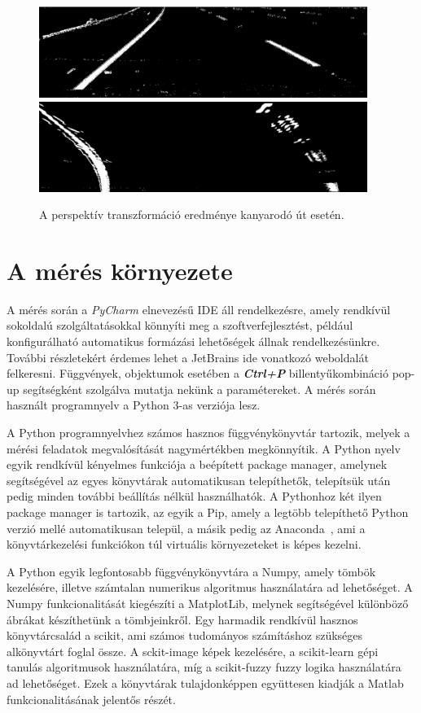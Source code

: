 \documentclass[12pt,a4paper,oneside]{report}             %
\begin{document}
\begin{figure}
	\centering
	\includegraphics[width=0.95\textwidth]{images/21.png}
	\includegraphics[width=0.95\textwidth]{images/22.png}
	\label{fig:2}
	\caption{A perspektív transzformáció eredménye kanyarodó út esetén.}
\end{figure}

\chapter{A mérés környezete}

A mérés során a \emph{PyCharm} elnevezésű IDE áll rendelkezésre, amely rendkívül sokoldalú szolgáltatásokkal könnyíti meg a szoftverfejlesztést, például konfigurálható automatikus formázási lehetőségek állnak rendelkezésünkre. További részletekért érdemes lehet a JetBrains ide vonatkozó weboldalát~\cite{pycharm} felkeresni. Függvények, objektumok esetében a \textbf{\textit{Ctrl+P}} billentyűkombináció pop-up segítségként szolgálva mutatja nekünk a paramétereket. A mérés során használt programnyelv a Python 3-as verziója lesz.

A Python programnyelvhez számos hasznos függvénykönyvtár tartozik, melyek a mérési feladatok megvalósítását nagymértékben megkönnyítik. A Python nyelv egyik rendkívül kényelmes funkciója a beépített package manager, amelynek segítségével az egyes könyvtárak automatikusan telepíthetők, telepítsük után pedig minden további beállítás nélkül használhatók. A Pythonhoz két ilyen package manager is tartozik, az egyik a Pip, amely a legtöbb telepíthető Python verzió mellé automatikusan települ, a másik pedig az Anaconda~\cite{conda}, ami a könyvtárkezelési funkciókon túl virtuális környezeteket is képes kezelni.

A Python egyik legfontosabb függvénykönyvtára a Numpy, amely tömbök kezelésére, illetve számtalan numerikus algoritmus használatára ad lehetőséget. A Numpy funkcionalitását kiegészíti a MatplotLib, melynek segítségével különböző ábrákat készíthetünk a tömbjeinkről. Egy harmadik rendkívül hasznos könyvtárcsalád a scikit, ami számos tudományos számításhoz szükséges alkönyvtárt foglal össze. A sckit-image képek kezelésére, a scikit-learn gépi tanulás algoritmusok használatára, míg a scikit-fuzzy fuzzy logika használatára ad lehetőséget. Ezek a könyvtárak tulajdonképpen együttesen kiadják a Matlab funkcionalitásának jelentős részét.
\end{document}
